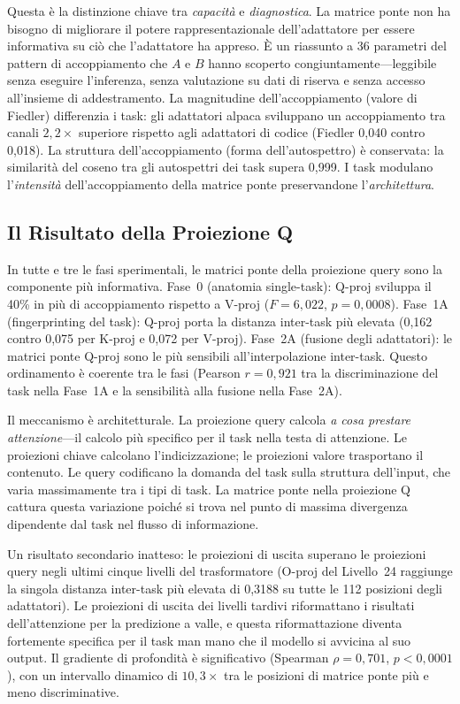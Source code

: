 \documentclass[11pt]{article}
\begin{document}
Questa \`e la distinzione chiave tra \emph{capacit\`a} e
\emph{diagnostica}. La matrice ponte non ha bisogno di migliorare il
potere rappresentazionale dell'adattatore per essere informativa su ci\`o
che l'adattatore ha appreso. \`E un riassunto a 36 parametri del
pattern di accoppiamento che $A$ e $B$ hanno scoperto
congiuntamente---leggibile senza eseguire l'inferenza, senza valutazione
su dati di riserva e senza accesso all'insieme di addestramento. La
magnitudine dell'accoppiamento (valore di Fiedler) differenzia i task:
gli adattatori alpaca sviluppano un accoppiamento tra canali $2{,}2\times$
superiore rispetto agli adattatori di codice (Fiedler 0,040 contro
0,018). La struttura dell'accoppiamento (forma dell'autospettro) \`e
conservata: la similarit\`a del coseno tra gli autospettri dei task
supera 0,999. I task modulano l'\emph{intensit\`a} dell'accoppiamento
della matrice ponte preservandone l'\emph{architettura}.

\subsection{Il Risultato della Proiezione Q}

In tutte e tre le fasi sperimentali, le matrici ponte della proiezione
query sono la componente pi\`u informativa. Fase~0 (anatomia
single-task): Q-proj sviluppa il 40\% in pi\`u di accoppiamento
rispetto a V-proj ($F = 6{,}022$, $p = 0{,}0008$). Fase~1A
(fingerprinting del task): Q-proj porta la distanza inter-task pi\`u
elevata (0,162 contro 0,075 per K-proj e 0,072 per V-proj). Fase~2A
(fusione degli adattatori): le matrici ponte Q-proj sono le pi\`u
sensibili all'interpolazione inter-task. Questo ordinamento \`e
coerente tra le fasi (Pearson $r = 0{,}921$ tra la discriminazione del
task nella Fase~1A e la sensibilit\`a alla fusione nella Fase~2A).

Il meccanismo \`e architetturale. La proiezione query calcola
\emph{a cosa prestare attenzione}---il calcolo pi\`u specifico per il
task nella testa di attenzione. Le proiezioni chiave calcolano
l'indicizzazione; le proiezioni valore trasportano il contenuto. Le
query codificano la domanda del task sulla struttura dell'input, che
varia massimamente tra i tipi di task. La matrice ponte nella proiezione
Q cattura questa variazione poich\'e si trova nel punto di massima
divergenza dipendente dal task nel flusso di informazione.

Un risultato secondario inatteso: le proiezioni di uscita superano le
proiezioni query negli ultimi cinque livelli del trasformatore (O-proj
del Livello~24 raggiunge la singola distanza inter-task pi\`u elevata
di 0,3188 su tutte le 112 posizioni degli adattatori). Le proiezioni
di uscita dei livelli tardivi riformattano i risultati dell'attenzione
per la predizione a valle, e questa riformattazione diventa fortemente
specifica per il task man mano che il modello si avvicina al suo output.
Il gradiente di profondit\`a \`e significativo (Spearman
$\rho = 0{,}701$, $p < 0{,}0001$), con un intervallo dinamico di
$10{,}3\times$ tra le posizioni di matrice ponte pi\`u e meno
discriminative.
\end{document}
